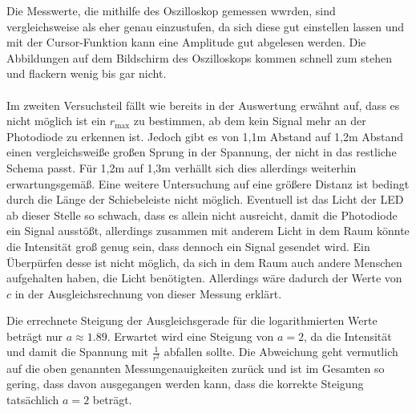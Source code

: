 Die Messwerte, die mithilfe des Oszilloskop gemessen wwrden, sind vergleichsweise als eher genau einzustufen, da sich diese gut einstellen lassen und mit der Cursor-Funktion kann eine Amplitude gut abgelesen werden.
Die Abbildungen auf dem Bildschirm des Oszilloskops kommen schnell zum stehen und flackern wenig bis gar nicht.
\\ \\
Im zweiten Versuchsteil fällt wie bereits in der Auswertung erwähnt auf, dass es nicht möglich ist ein $r_\text{max}$ zu bestimmen, ab dem kein Signal mehr an der Photodiode zu erkennen ist.
Jedoch gibt es von 1,1m Abstand auf 1,2m Abstand einen vergleichsweiße großen Sprung in der Spannung, der nicht in das restliche Schema passt.
Für 1,2m auf 1,3m verhällt sich dies allerdings weiterhin erwartungsgemäß. Eine weitere Untersuchung auf eine größere Distanz ist bedingt durch die Länge der Schiebeleiste nicht möglich.
Eventuell ist das Licht der LED ab dieser Stelle so schwach, dass es allein nicht ausreicht, damit die Photodiode ein Signal ausstößt, allerdings zusammen mit anderem Licht in dem Raum könnte die Intensität groß genug sein, dass dennoch ein Signal gesendet wird.
Ein Überpürfen desse ist nicht möglich, da sich in dem Raum auch andere Menschen aufgehalten haben, die Licht benötigten.
Allerdings wäre dadurch der Werte von $c$ in der Ausgleichsrechnung von dieser Messung erklärt.

Die errechnete Steigung der Ausgleichsgerade für die logarithmierten Werte beträgt nur $a \approx 1.89$. Erwartet wird eine Steigung von $a = 2$, da die Intensität und damit die Spannung mit $\frac{1}{r^2}$ abfallen sollte.
Die Abweichung geht vermutlich auf die oben genannten Messungenauigkeiten zurück und ist im Gesamten so gering, dass davon ausgegangen werden kann, dass die korrekte Steigung tatsächlich $a = 2$ beträgt. 